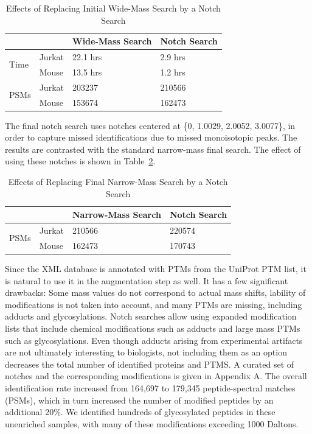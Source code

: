 \documentclass[journal=jprobs,manuscript=article]{achemso}
\begin{document}
\begin{table}[]
\centering
\caption{Effects of Replacing Initial Wide-Mass Search by a Notch Search}
\label{my-labelff}
\begin{tabular}{ll|l|l}
                      &        & Wide-Mass Search & Notch Search\\
\hline
\multirow{2}{*}{Time} & Jurkat & 22.1 hrs         & 2.9 hrs    \\
                      & Mouse  & 13.5 hrs         & 1.2 hrs   \\
\hline
\multirow{2}{*}{PSMs} & Jurkat & 203237           & 210566    \\
                      & Mouse  & 153674           & 162473   
\end{tabular}
\end{table}


The final notch search uses notches centered at \{0, 1.0029, 2.0052, 3.0077\}, in order to capture missed identifications due to missed monoisotopic peaks.
The results are contrasted with the standard narrow-mass final search.
The effect of using these notches is shown in Table~\ref{tab:table2}.

\begin{table}[]
\centering
\caption{Effects of Replacing Final Narrow-Mass Search by a Notch Search}
\label{tab:table2}
\begin{tabular}{ll|l|l}
                      &        & Narrow-Mass Search & Notch Search\\
\hline
\multirow{2}{*}{PSMs} & Jurkat  & 210566   &  220574  \\
                      & Mouse    & 162473   &   170743
\end{tabular}
\end{table}

Since the XML database is annotated with PTMs from the UniProt PTM list, it is natural to use it in the augmentation step as well.
It has a few significant drawbacks: Some mass values do not correspond to actual mass shifts, lability of modifications is not taken into account, and many PTMs are missing, including adducts and glycosylations.
Notch searches allow using expanded modification lists that include chemical modifications such as adducts and large mass PTMs such as glycosylations.
Even though adducts arising from experimental artifacts are not ultimately interesting to biologists, not including them as an option decreases the total number of identified proteins and PTMS.
A curated set of notches and the corresponding modifications is given in Appendix A.
The overall identification rate increased from 164,697 to 179,345 peptide-spectral matches (PSMs), which in turn increased the number of modified peptides by an additional 20\%.
We identified hundreds of glycosylated peptides in these unenriched samples, with many of these modifications exceeding 1000 Daltons. 
\end{document}
